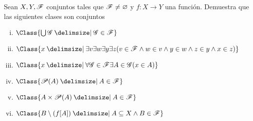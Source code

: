 \begin{exercise}
  Sean $X,Y, \mathscr{F}$ conjuntos tales que $\mathscr{F}\neq \varnothing$ y $f\colon X\to Y$ una función. Demuestra que las siguientes clases son conjuntos
  \begin{enumerate}[i)]
      \item $\Class{\bigcup \ms{G}\st \ms{G}\in \ms{F}}$
      \item $\Class{x \st \exists v \exists w \exists y \exists z (v\in \ms{F} \wedge w\in v \wedge y \in w \wedge z \in y \wedge x \in z)}$
      \item $\Class{x \st \forall \ms{G} \in \ms{F} \exists A \in \ms{G} (x\in A)}$
      \item $\Class{\ms{P}(A)\st A\in \ms{F}}$
      \item $\Class{A\times \ms{P}(A)\st A\in \ms{F}}$
      \item $\Class{B\setminus(f[A])\st A\subseteq X \wedge B\in \ms{F}}$
  \end{enumerate}
\end{exercise}